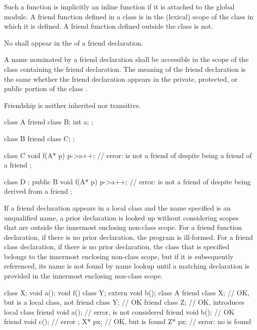 \pnum
Such a function is implicitly an inline function
if it is attached to the global module.
A friend
function defined in a class is in the (lexical) scope of the class in which it is defined.
A friend function defined outside the class is not.

\pnum
No
shall appear in the
of a friend declaration.

\pnum
{}%
A name nominated by a friend declaration shall be accessible in the scope of the
class containing the friend declaration.
The meaning of the friend declaration is the same whether the friend declaration
appears in the private, protected, or public
portion of the class
.

\pnum
{}%
Friendship is neither inherited nor transitive.
\begin{example}
\begin{codeblock}
class A {
  friend class B;
  int a;
};

class B {
  friend class C;
};

class C  {
  void f(A* p) {
    p->a++;         // error:  is not a friend of  despite being a friend of a friend
  }
};

class D : public B  {
  void f(A* p) {
    p->a++;         // error:  is not a friend of  despite being derived from a friend
  }
};
\end{codeblock}
\end{example}

\pnum
{}%
%
If a friend declaration appears in a local class and the
name specified is an unqualified name, a prior declaration is looked
up without considering scopes that are outside the innermost enclosing
non-class scope.
For a friend function declaration, if there is no
prior declaration, the program is ill-formed.
For a friend class
declaration, if there is no prior declaration, the class that is
specified belongs to the innermost enclosing non-class scope, but if it is
subsequently referenced, its name is not found by name lookup
until a matching declaration is provided in the innermost enclosing
non-class scope.
\begin{example}
\begin{codeblock}
class X;
void a();
void f() {
  class Y;
  extern void b();
  class A {
  friend class X;   // OK, but  is a local class, not 
  friend class Y;   // OK
  friend class Z;   // OK, introduces local class 
  friend void a();  // error,  is not considered
  friend void b();  // OK
  friend void c();  // error
  };
  X* px;            // OK, but  is found
  Z* pz;            // error: no  is found
}
\end{codeblock}
\end{example}

